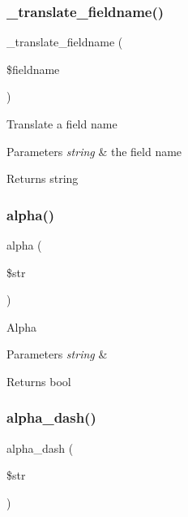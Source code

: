 \subsubsection{\texorpdfstring{\+\_\+translate\+\_\+fieldname()}{\_translate\_fieldname()}}
{\footnotesize\ttfamily \+\_\+translate\+\_\+fieldname (\begin{DoxyParamCaption}\item[{}]{\$fieldname }\end{DoxyParamCaption})\hspace{0.3cm}{\ttfamily [protected]}}

Translate a field name


\begin{DoxyParams}{Parameters}
{\em string} & the field name \\
\hline
\end{DoxyParams}
\begin{DoxyReturn}{Returns}
string 
\end{DoxyReturn}
\mbox{\label{class_c_i___form__validation_a4784b18b432005bec36cdf437353ec76}} 
\subsubsection{\texorpdfstring{alpha()}{alpha()}}
{\footnotesize\ttfamily alpha (\begin{DoxyParamCaption}\item[{}]{\$str }\end{DoxyParamCaption})}

Alpha


\begin{DoxyParams}{Parameters}
{\em string} & \\
\hline
\end{DoxyParams}
\begin{DoxyReturn}{Returns}
bool 
\end{DoxyReturn}
\mbox{\label{class_c_i___form__validation_a4d1ca92bb78369923e57b2f6aca58c70}} 
\subsubsection{\texorpdfstring{alpha\+\_\+dash()}{alpha\_dash()}}
{\footnotesize\ttfamily alpha\+\_\+dash (\begin{DoxyParamCaption}\item[{}]{\$str }\end{DoxyParamCaption})}

